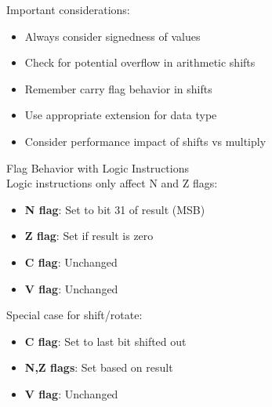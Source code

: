 \begin{remark}
Important considerations:
\begin{itemize}
  \item Always consider signedness of values
  \item Check for potential overflow in arithmetic shifts
  \item Remember carry flag behavior in shifts
  \item Use appropriate extension for data type
  \item Consider performance impact of shifts vs multiply
\end{itemize}
\end{remark}

\begin{concept}{Flag Behavior with Logic Instructions}\\
Logic instructions only affect N and Z flags:
\begin{itemize}
  \item \textbf{N flag}: Set to bit 31 of result (MSB)
  \item \textbf{Z flag}: Set if result is zero
  \item \textbf{C flag}: Unchanged
  \item \textbf{V flag}: Unchanged
\end{itemize}

Special case for shift/rotate:
\begin{itemize}
  \item \textbf{C flag}: Set to last bit shifted out
  \item \textbf{N,Z flags}: Set based on result
  \item \textbf{V flag}: Unchanged
\end{itemize}
\end{concept}

